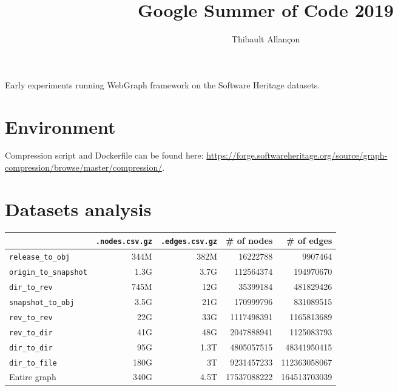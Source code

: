 \documentclass[11pt,a4paper]{article}
\title{Google Summer of Code 2019}
\author{Thibault Allançon}
\date{}
\begin{document}
\maketitle

Early experiments running WebGraph framework on the Software Heritage datasets.

\section{Environment}

Compression script and Dockerfile can be found here:
\url{https://forge.softwareheritage.org/source/graph-compression/browse/master/compression/}.

\section{Datasets analysis}

\begin{center}
    \begin{tabular}{@{} l *4r @{}}
        \toprule
        \multicolumn{1}{c}{} &
            \textbf{\texttt{.nodes.csv.gz}} &
            \textbf{\texttt{.edges.csv.gz}} &
            \textbf{\# of nodes} & \textbf{\# of edges} \\
        \midrule
        \texttt{release\_to\_obj}
            & 344M & 382M & \num{16222788} & \num{9907464} \\
        \texttt{origin\_to\_snapshot}
            & 1.3G & 3.7G & \num{112564374} & \num{194970670} \\
        \texttt{dir\_to\_rev}
            & 745M & 12G & \num{35399184} & \num{481829426} \\
        \texttt{snapshot\_to\_obj}
            & 3.5G & 21G & \num{170999796} & \num{831089515} \\
        \texttt{rev\_to\_rev}
            & 22G & 33G & \num{1117498391} & \num{1165813689} \\
        \texttt{rev\_to\_dir}
            & 41G & 48G & \num{2047888941} & \num{1125083793} \\
        \texttt{dir\_to\_dir}
            & 95G & 1.3T & \num{4805057515} & \num{48341950415} \\
        \texttt{dir\_to\_file}
            & 180G & 3T & \num{9231457233} & \num{112363058067} \\
        \midrule
        Entire graph & 340G & 4.5T & \num{17537088222} & \num{164513703039} \\
        \bottomrule
    \end{tabular}
\end{center}
\end{document}
